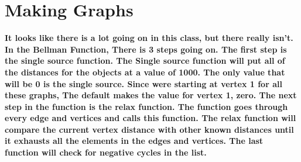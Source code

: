 \documentclass{article}
\begin{document}
\section{Making Graphs}
\textbf{It looks like there is a lot going on in this class, but there really isn't. In the Bellman Function, There is 3 steps going on. The first step is the single source function. The Single source function will put all of the distances for the objects at a value of 1000. The only value that will be 0 is the single source. Since were starting at vertex 1 for all these graphs, The default makes the value for vertex 1, zero. The next step in the function is the relax function. The function goes through every edge and vertices and calls this function. The relax function will compare the current vertex distance with other known distances until it exhausts all the elements in the edges and vertices. The last function will check for negative cycles in the list.  }
\end{document}
